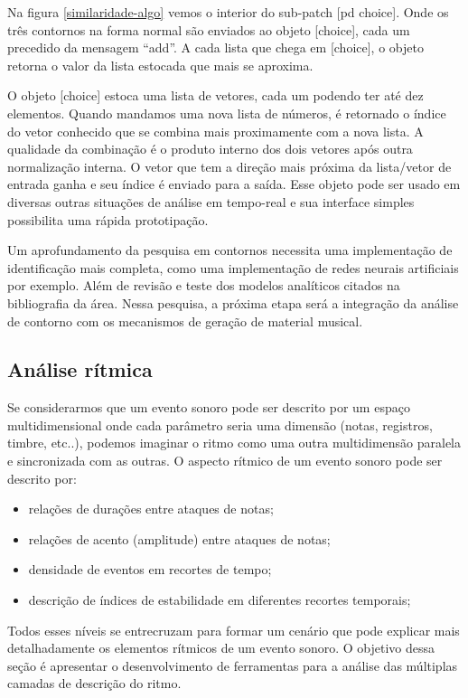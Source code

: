 \documentclass{ppgmus}
\begin{document}
Na figura \ref{similaridade-algo} vemos o interior do sub-patch [pd choice].
Onde os três contornos na forma normal são enviados ao objeto [choice], cada um
precedido da mensagem ``add''. A cada lista que chega em [choice], o objeto retorna
o valor da lista estocada que mais se aproxima.

O objeto [choice] estoca uma lista de vetores, cada um podendo ter até dez
elementos. Quando mandamos uma nova lista de números, é retornado o índice
do vetor conhecido que se combina mais proximamente com a nova lista. A qualidade
da combinação  é o produto interno dos dois vetores após outra normalização
interna. O vetor que tem a direção mais próxima da lista/vetor de entrada ganha e seu
índice é enviado para a saída. Esse objeto pode ser usado em diversas outras situações
de análise em tempo-real e sua interface simples possibilita uma rápida prototipação.

Um aprofundamento da pesquisa em contornos necessita uma implementação de identificação
mais completa, como uma implementação de redes neurais artificiais por exemplo. Além
de revisão e teste dos modelos analíticos citados na bibliografia da área.
Nessa pesquisa, a próxima etapa será a integração da análise de contorno com os
mecanismos de geração de material musical.

\subsection{Análise rítmica}

Se considerarmos que um evento sonoro pode ser descrito por um espaço multidimensional
onde cada parâmetro seria uma dimensão (notas, registros, timbre, etc..), podemos
imaginar o ritmo como uma outra multidimensão paralela e sincronizada com as outras.
O aspecto rítmico de um evento sonoro pode ser descrito por:
\begin{itemize}
 \item relações de durações entre ataques de notas;
\item relações de acento (amplitude) entre ataques de notas;
\item densidade de eventos em recortes de tempo;
\item descrição de índices de estabilidade em diferentes recortes temporais;
\end{itemize}

Todos esses níveis se entrecruzam para formar um cenário que pode explicar mais detalhadamente
os elementos rítmicos de um evento sonoro. O objetivo dessa seção é apresentar o desenvolvimento de
ferramentas para a análise das múltiplas camadas de descrição do ritmo.
\end{document}
